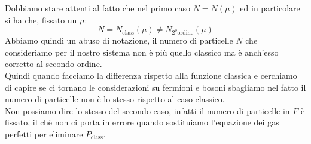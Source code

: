 Dobbiamo stare attenti al fatto che nel primo caso $N = N ( \mu ) $ ed in particolare si ha che, fissato un $\mu $:
\[
N = N_{\text{class}}( \mu ) \neq N_{2^o\text{ordine}}( \mu ) 
\]
Abbiamo quindi un abuso di notazione, il numero di particelle $N$ che consideriamo per il nostro sistema non è più quello classico ma è anch'esso corretto al secondo ordine.\\
Quindi quando facciamo la differenza rispetto alla funzione classica e cerchiamo di capire se ci tornano le considerazioni su fermioni e bosoni sbagliamo nel fatto il numero di particelle non è lo stesso rispetto al caso classico.\\
Non possiamo dire lo stesso del secondo caso, infatti il numero di particelle in  $F$ è fissato, il chè non ci porta in errore quando sostituiamo l'equazione dei gas perfetti per eliminare $P_{\text{class}}$.

